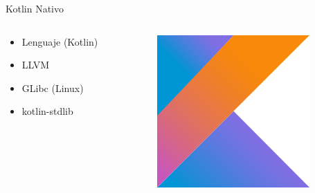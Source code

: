 \documentclass[aspectratio=169]{beamer}
\begin{document}
\begin{frame}[fragile]{Kotlin Nativo}
    \begin{columns}
        \begin{column}{0.5\textwidth}
            \begin{itemize}
                \item Lenguaje (Kotlin)
                \item LLVM
                \item GLibc (Linux)
                \item kotlin-stdlib
            \end{itemize}
        \end{column}
        \begin{column}{0.5\textwidth}  %
            \begin{figure}
                \centering
                \includegraphics[width=0.4\linewidth]{Images/kotlin}
            \end{figure}
        \end{column}
    \end{columns}
    
\end{frame}
\end{document}
